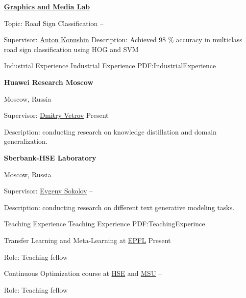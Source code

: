 \documentclass[letterpaper,MMMyyyy,nonstopmode]{simpleresumecv}
\begin{document}
\begin{Body}
\Gap

\Entry
\href{https://graphics.cs.msu.ru}
{\textbf{Graphics and Media Lab}}

\Gap
\BulletItem
Topic: Road Sign Classification
\hfill
{} --
\begin{Detail}
\SubBulletItem
Supervisor:
\href{https://www.hse.ru/en/staff/akonushin}{Anton Konushin}
\SubBulletItem
Description:
Achieved 98 \% accuracy in multiclass road sign classification \newline
using HOG and SVM
\end{Detail}



\Section
{Industrial Experience}
{Industrial Experience}
{PDF:IndustrialExperience}

\Entry
\textbf{Huawei Research Moscow}
\par
Moscow, Russia

\Gap
\BulletItem
Supervisor: \href{https://bayesgroup.ru/people/dmitry-vetrov/}{Dmitry Vetrov}
\hfill
Present
\begin{Detail}
\SubBulletItem
Description: conducting research on knowledge distillation and domain generalization.
\end{Detail}

\Gap

\Entry
\textbf{Sberbank-HSE Laboratory}
\par
Moscow, Russia

\Gap
\BulletItem
Supervisor: \href{https://www.hse.ru/en/staff/esokolov}{Evgeny Sokolov}
\hfill
{} --
\begin{Detail}
\SubBulletItem
Description: conducting research on different text generative modeling tasks.
\end{Detail}



\Section
{Teaching Experience}
{Teaching Experience}
{PDF:TeachingExperince}

\BulletItem
Transfer Learning and Meta-Learning at \href{https://edu.epfl.ch/coursebook/en/transfer-learning-and-meta-learning-CS-625}{EPFL}
\hfill
Present
\begin{Detail}
\Item
Role: Teaching fellow
\end{Detail}

\BulletItem
Continuous Optimization course at \href{https://cs.hse.ru/en/}{HSE} and \href{https://cs.msu.ru/en}{MSU}
\hfill
{} --
\begin{Detail}
\Item
Role: Teaching fellow
\end{Detail}


\end{Body}
\end{document}
